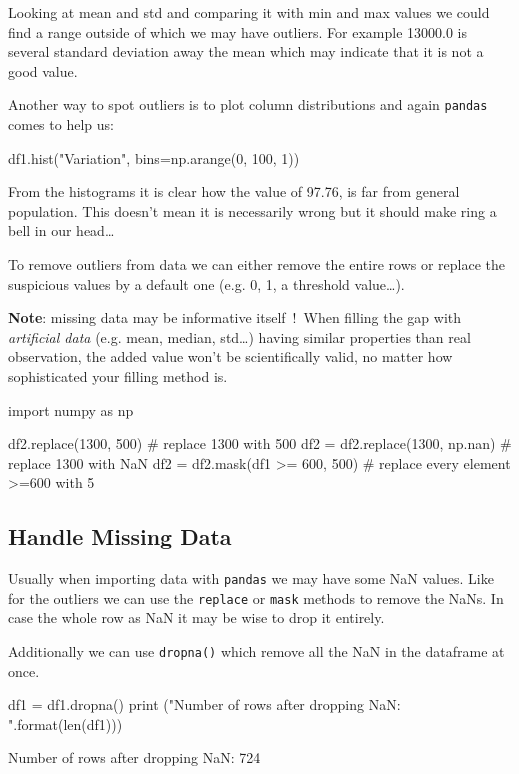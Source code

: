 Looking at mean and std and comparing it with min and max values we could find a range outside of which we may have outliers. For example 13000.0 is several standard deviation away the mean which may indicate that it is not a good value.

Another way to spot outliers is to plot column distributions and again \texttt{pandas} comes to help us:
\begin{ipython}
df1.hist("Variation", bins=np.arange(0, 100, 1))
\end{ipython}
\begin{ioutput}
\end{ioutput}

From the histograms it is clear how the value of 97.76, is far from general population. 
This doesn't mean it is necessarily wrong but it should make ring a bell in our head\ldots

To remove outliers from data we can either remove the entire rows or replace the suspicious values by a default one 
(e.g. 0, 1, a threshold value\ldots).

\textbf{Note}: missing data may be informative itself~!~When filling the gap with \emph{artificial data} 
(e.g. mean, median, std\ldots) having similar properties than real observation, the added value won't be 
scientifically valid, no matter how sophisticated your filling method is.

\begin{ipython}
import numpy as np

df2.replace(1300, 500) # replace 1300 with 500
df2 = df2.replace(1300, np.nan) # replace 1300 with NaN
df2 = df2.mask(df1 >= 600, 500) # replace every element >=600 with 5
\end{ipython}

\subsection{Handle Missing Data}\label{handle-missing-data}

Usually when importing data with \texttt{pandas} we may have some NaN values.
Like for the outliers we can use the \texttt{replace} or \texttt{mask} methods to remove the NaNs. 
In case the whole row as NaN it may be wise to drop it entirely.

Additionally we can use \texttt{dropna()} which remove all the NaN in the dataframe at once.

\begin{ipython}
df1 = df1.dropna()
print ("Number of rows after dropping NaN: {}".format(len(df1)))
\end{ipython}
\begin{ioutput}
Number of rows after dropping NaN: 724
\end{ioutput}


